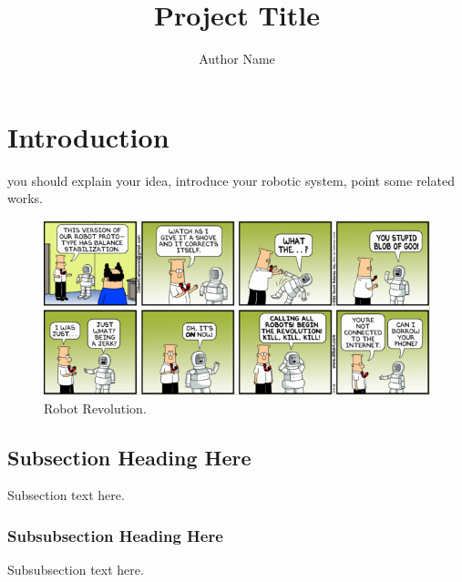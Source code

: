\documentclass[10pt,journal,compsoc]{IEEEtran}
\begin{document}
\title{Project Title}

\author{Author Name}

%
{}


\maketitle
\IEEEdisplaynontitleabstractindextext
\IEEEpeerreviewmaketitle
\section{Introduction}
\label{sec:introduction}

 you should explain your idea, introduce your robotic system, point some related works.

\begin{figure}[thpb]
      \centering
      \includegraphics[width=\linewidth]{RobotRevolution5}
      \caption{Robot Revolution.}
      \label{fig:robot1}
\end{figure}

\subsection{Subsection Heading Here}
Subsection text here.

\subsubsection{Subsubsection Heading Here}
Subsubsection text here.
\end{document}
